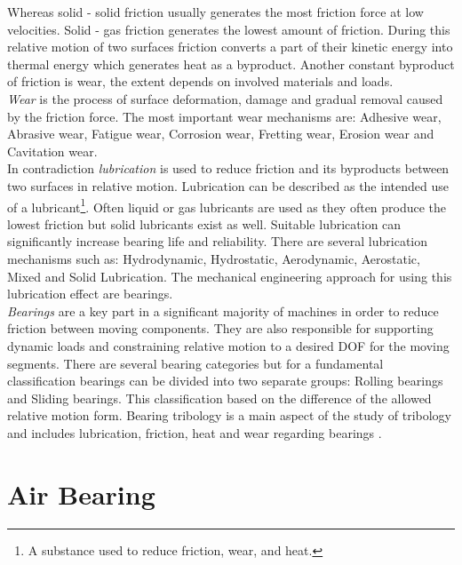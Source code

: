 Whereas solid - solid friction usually generates the most friction force at low velocities. Solid - gas friction generates the lowest amount of friction.
During this relative motion of two surfaces friction converts a part of their kinetic energy into thermal energy which generates heat as a byproduct. Another constant byproduct of friction is wear, the extent depends on involved materials and loads.\\\textit{Wear} is the process of surface deformation, damage and gradual removal caused by the friction force. The most important wear mechanisms are: Adhesive wear, Abrasive wear, Fatigue wear, Corrosion wear, Fretting wear, Erosion wear and Cavitation wear.\\

In contradiction \textit{lubrication} is used to reduce friction and its byproducts between two surfaces in relative motion. Lubrication can be described as the intended use of a lubricant\footnote{A substance used to reduce friction, wear, and heat.}. Often liquid or gas lubricants are used as they often produce the lowest friction but solid lubricants exist as well. Suitable lubrication can significantly increase bearing life and reliability. There are several lubrication mechanisms such as: Hydrodynamic, Hydrostatic, Aerodynamic, Aerostatic, Mixed and Solid Lubrication. The mechanical engineering approach for using this lubrication effect are bearings.\\
\textit{Bearings} are a key part in a significant majority of machines in order to reduce friction between moving components. They are also responsible for supporting dynamic loads and constraining relative motion to a desired DOF for the moving segments. There are several bearing categories but for a fundamental classification bearings can be divided into two separate groups: Rolling bearings and Sliding bearings. This classification based on the difference of the allowed relative motion form. Bearing tribology is a main aspect of the study of tribology and includes lubrication, friction, heat and wear regarding bearings \cite{Qiu.2017}\cite{Brecher.2017}.


\section{Air Bearing}
